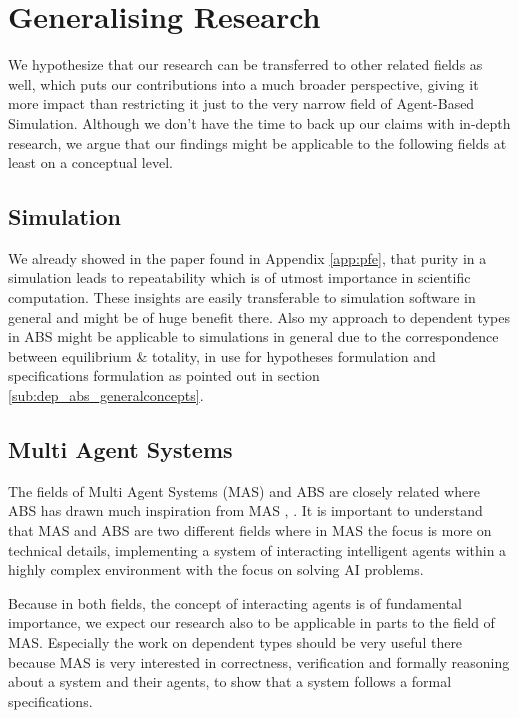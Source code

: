 \chapter{Generalising Research}
\label{chap:generalising}

We hypothesize that our research can be transferred to other related fields as well, which puts our contributions into a much broader perspective, giving it more impact than restricting it just to the very narrow field of Agent-Based Simulation. Although we don't have the time to back up our claims with in-depth research, we argue that our findings might be applicable to the following fields at least on a conceptual level.

\section{Simulation}
We already showed in the paper found in Appendix \ref{app:pfe}, that purity in a simulation leads to repeatability which is of utmost importance in scientific computation. These insights are easily transferable to simulation software in general and might be of huge benefit there. Also my approach to dependent types in ABS might be applicable to simulations in general due to the correspondence between equilibrium \& totality, in use for hypotheses formulation and specifications formulation as pointed out in section \ref{sub:dep_abs_generalconcepts}. 

\section{Multi Agent Systems}
The fields of Multi Agent Systems (MAS) and ABS are closely related where ABS has drawn much inspiration from MAS \cite{wooldridge_introduction_2009}, \cite{weiss_multiagent_2013}. It is important to understand that MAS and ABS are two different fields where in MAS the focus is more on technical details, implementing a system of interacting intelligent agents within a highly complex environment with the focus on solving AI problems.

Because in both fields, the concept of interacting agents is of fundamental importance, we expect our research also to be applicable in parts to the field of MAS. Especially the work on dependent types should be very useful there because MAS is very interested in correctness, verification and formally reasoning about a system and their agents, to show that a system follows a formal specifications.

